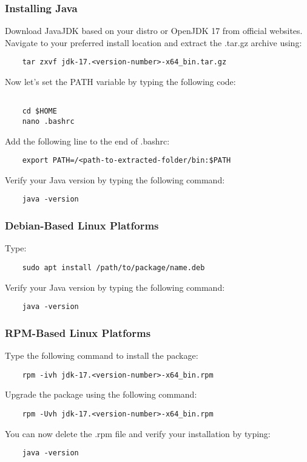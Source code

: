 \subsubsection{Installing Java}
Download JavaJDK based on your distro or OpenJDK 17 from official websites.\\
Navigate to your preferred install location and extract the .tar.gz archive using:
\begin{verbatim}
    tar zxvf jdk-17.<version-number>-x64_bin.tar.gz
\end{verbatim}
Now let's set the PATH variable by typing the following code:\\
\begin{verbatim}

    cd $HOME
    nano .bashrc

\end{verbatim}

Add the following line to the end of .bashrc:

\begin{verbatim}
    export PATH=/<path-to-extracted-folder/bin:$PATH

\end{verbatim}

Verify your Java version by typing the following command:
\begin{verbatim}
    java -version
\end{verbatim}

\subsubsection*{Debian-Based Linux Platforms}
Type:

\begin{verbatim}
    sudo apt install /path/to/package/name.deb
\end{verbatim}


Verify your Java version by typing the following command:

\begin{verbatim}
    java -version
\end{verbatim}

\subsubsection*{RPM-Based Linux Platforms}
Type the following command to install the package:
\begin{verbatim}
    rpm -ivh jdk-17.<version-number>-x64_bin.rpm 
\end{verbatim}
Upgrade the package using the following command:
\begin{verbatim}
    rpm -Uvh jdk-17.<version-number>-x64_bin.rpm
\end{verbatim}
You can now delete the .rpm file and verify your installation by typing:
\begin{verbatim}
    java -version
\end{verbatim}
